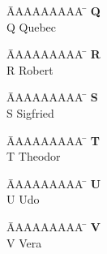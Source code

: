 \vspace*{-1.5cm}
\begin{tabbing}
	\hspace{0.0cm}  \= AAAAAAAAA \=       \hspace{2cm} \kill
	\>\textbf{Q} 	\> \\
	\>Q 			\>  Quebec\\
\end{tabbing}

\vspace*{-1.5cm}
\begin{tabbing}
	\hspace{0.0cm}  \= AAAAAAAAA \=       \hspace{2cm} \kill
	\>\textbf{R} 	\> \\
	\>R 			\>  Robert\\
\end{tabbing}

\vspace*{-1.5cm}
\begin{tabbing}
	\hspace{0.0cm}  \= AAAAAAAAA \=       \hspace{2cm} \kill
	\>\textbf{S} 	\> \\
	\>S 			\>  Sigfried\\
\end{tabbing}

\vspace*{-1.5cm}
\begin{tabbing}
	\hspace{0.0cm}  \= AAAAAAAAA \=       \hspace{2cm} \kill
	\>\textbf{T} 	\> \\
	\>T 			\>  Theodor\\
\end{tabbing}

\vspace*{-1.5cm}
\begin{tabbing}
	\hspace{0.0cm}  \= AAAAAAAAA \=       \hspace{2cm} \kill
	\>\textbf{U} 	\> \\
	\>U 			\>  Udo\\
\end{tabbing}

\vspace*{-1.5cm}
\begin{tabbing}
	\hspace{0.0cm}  \= AAAAAAAAA \=       \hspace{2cm} \kill
	\>\textbf{V} 	\> \\
	\>V 			\>  Vera\\
\end{tabbing}

